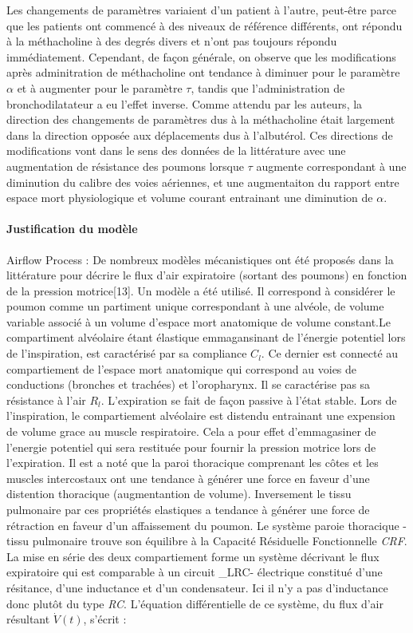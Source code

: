 \documentclass[12pt,]{article}
\let\oldparagraph\paragraph
\renewcommand{\paragraph}[1]{\oldparagraph{#1}\mbox{}}
\begin{document}
Les changements de paramètres variaient d'un patient à l'autre,
peut-être parce que les patients ont commencé à des niveaux de référence
différents, ont répondu à la méthacholine à des degrés divers et n'ont
pas toujours répondu immédiatement. Cependant, de façon générale, on
observe que les modifications après adminitration de méthacholine ont
tendance à diminuer pour le paramètre \(\alpha\) et à augmenter pour le
paramètre \(\tau\), tandis que l'administration de bronchodilatateur a
eu l'effet inverse. Comme attendu par les auteurs, la direction des
changements de paramètres dus à la méthacholine était largement dans la
direction opposée aux déplacements dus à l'albutérol. Ces directions de
modifications vont dans le sens des données de la littérature avec une
augmentation de résistance des poumons lorsque \(\tau\) augmente
correspondant à une diminution du calibre des voies aériennes, et une
augmentaiton du rapport entre espace mort physiologique et volume
courant entrainant une diminution de \(\alpha\).

\hypertarget{justification-du-modele}{%
\paragraph{Justification du modèle}\label{justification-du-modele}}

Airflow Process : De nombreux modèles mécanistiques ont été proposés
dans la littérature pour décrire le flux d'air expiratoire (sortant des
poumons) en fonction de la pression motrice{[}13{]}. Un modèle a été
utilisé. Il correspond à considérer le poumon comme un partiment unique
correspondant à une alvéole, de volume variable associé à un volume
d'espace mort anatomique de volume constant.Le compartiment alvéolaire
étant élastique emmagansinant de l'énergie potentiel lors de
l'inspiration, est caractérisé par sa compliance \(C_{l}\). Ce dernier
est connecté au compartiement de l'espace mort anatomique qui correspond
au voies de conductions (bronches et trachées) et l'oropharynx. Il se
caractérise pas sa résistance à l'air \(R_{l}\). L'expiration se fait de
façon passive à l'état stable. Lors de l'inspiration, le compartiement
alvéolaire est distendu entrainant une expension de volume grace au
muscle respiratoire. Cela a pour effet d'emmagasiner de l'energie
potentiel qui sera restituée pour fournir la pression motrice lors de
l'expiration. Il est a noté que la paroi thoracique comprenant les côtes
et les muscles intercostaux ont une tendance à générer une force en
faveur d'une distention thoracique (augmentantion de volume).
Inversement le tissu pulmonaire par ces propriétés elastiques a tendance
à générer une force de rétraction en faveur d'un affaissement du poumon.
Le système paroie thoracique - tissu pulmonaire trouve son équilibre à
la Capacité Résiduelle Fonctionnelle \emph{CRF}. La mise en série des
deux compartiement forme un système décrivant le flux expiratoire qui
est comparable à un circuit \_LRC- électrique constitué d'une résitance,
d'une inductance et d'un condensateur. Ici il n'y a pas d'inductance
donc plutôt du type \emph{RC}. L'équation différentielle de ce système,
du flux d'air résultant \(\dot{V}(t)\), s'écrit :
\end{document}
